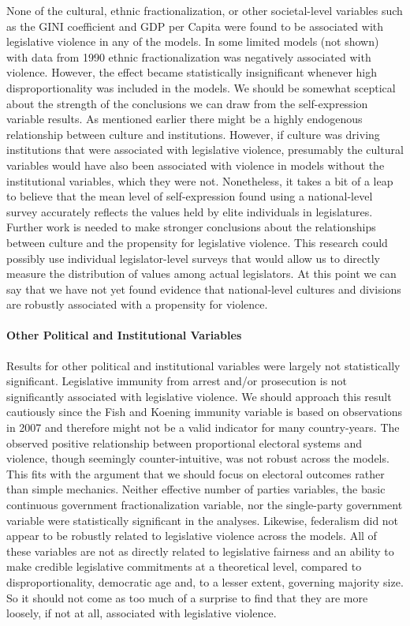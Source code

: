 \documentclass[a4paper]{article}\usepackage[]{graphicx}\usepackage[]{color}
\begin{document}
None of the cultural, ethnic fractionalization, or other societal-level variables such as the GINI coefficient and GDP per Capita were found to be associated with legislative violence in any of the models. In some limited models (not shown) with data from 1990 ethnic fractionalization was negatively associated with violence. However, the effect became statistically insignificant whenever high disproportionality was included in the models. We should be somewhat sceptical about the strength of the conclusions we can draw from the self-expression variable results. As mentioned earlier there might be a highly endogenous relationship between culture and institutions. However, if culture was driving institutions that were associated with legislative violence, presumably the cultural variables would have also been associated with violence in models without the institutional variables, which they were not. Nonetheless, it takes a bit of a leap to believe that the mean level of self-expression found using a national-level survey accurately reflects the values held by elite individuals in legislatures. Further work is needed to make stronger conclusions about the relationships between culture and the propensity for legislative violence. This research could possibly use individual legislator-level surveys that would allow us to directly measure the distribution of values among actual legislators. At this point we can say that we have not yet found evidence that national-level cultures and divisions are robustly associated with a propensity for violence.

\paragraph{Other Political and Institutional Variables}

Results for other political and institutional variables were largely not statistically significant. Legislative immunity from arrest and/or prosecution is not significantly associated with legislative violence. We should approach this result cautiously since the Fish and Koening immunity variable is based on observations in 2007 and therefore might not be a valid indicator for many country-years. The observed positive relationship between proportional electoral systems and violence, though seemingly counter-intuitive, was not robust across the models. This fits with the argument that we should focus on electoral outcomes rather than simple mechanics. Neither effective number of parties variables, the basic continuous government fractionalization variable, nor the single-party government variable were statistically significant in the analyses. Likewise, federalism did not appear to be robustly related to legislative violence across the models. All of these variables are not as directly related to legislative fairness and an ability to make credible legislative commitments at a theoretical level, compared to disproportionality, democratic age and, to a lesser extent, governing majority size. So it should not come as too much of a surprise to find that they are more loosely, if not at all, associated with legislative violence.
\end{document}
